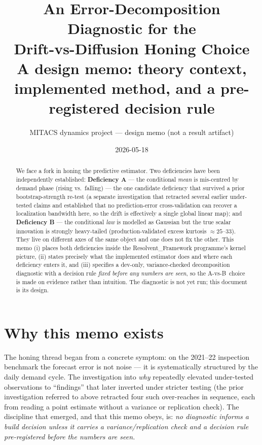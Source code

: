\documentclass[11pt]{article}
\title{\textbf{An Error-Decomposition Diagnostic for the\\
Drift-vs-Diffusion Honing Choice}\\[4pt]
\large A design memo: theory context, implemented method, and a
pre-registered decision rule}
\author{MITACS dynamics project --- design memo (not a result artifact)}
\date{2026-05-18}
\newcommand{\defA}{\textsf{A}}
\newcommand{\defB}{\textsf{B}}
\begin{document}
\maketitle

\begin{abstract}
We face a fork in honing the predictive estimator. Two deficiencies have
been independently established: \textbf{Deficiency \defA} --- the
conditional \emph{mean} is mis-centred by demand phase (rising vs.\
falling) --- the one candidate deficiency that survived a prior
bootstrap-strength re-test (a separate investigation that retracted
several earlier under-tested claims and established that no
prediction-error cross-validation can recover a localization
bandwidth here, so the drift is effectively a single global linear
map); and \textbf{Deficiency \defB} --- the conditional \emph{law}
is modelled as Gaussian but the true scalar innovation is strongly
heavy-tailed (production-validated excess kurtosis ${\approx}25\text{--}33$).
They live on different axes of the same object and one does not fix the
other. This memo (i) places both deficiencies inside the
Resolvent\_Framework programme's kernel picture, (ii) states precisely
what the implemented estimator does and where each deficiency enters it,
and (iii) specifies a dev-only, variance-checked decomposition diagnostic
with a decision rule \emph{fixed before any numbers are seen}, so the
\defA-vs-\defB\ choice is made on evidence rather than intuition. The
diagnostic is not yet run; this document is its design.
\end{abstract}

\section{Why this memo exists}

The honing thread began from a concrete symptom: on the 2021--22
inspection benchmark the forecast error is not noise --- it is
systematically structured by the daily demand cycle. The investigation
into \emph{why} repeatedly elevated under-tested observations to
``findings'' that later inverted under stricter testing (the prior
investigation referred to above retracted four such over-reaches in
sequence, each from reading a point estimate without a variance or
replication check). The discipline that
emerged, and that this memo obeys, is: \emph{no diagnostic informs a
build decision unless it carries a variance/replication check and a
decision rule pre-registered before the numbers are seen.}
\end{document}
